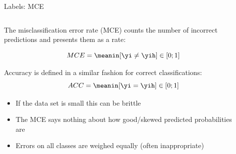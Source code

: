 \documentclass[11pt,compress,t,notes=noshow, xcolor=table]{beamer}
\begin{document}
\begin{vbframe}{Labels: MCE}

\begin{columns}
\begin{column}{0.7\textwidth} 
\begin{footnotesize}
The misclassification error rate (MCE) counts the number of incorrect predictions and presents them as a rate:

\[
MCE = \meanin [\yi \neq \yih] \in [0;1]
\]

Accuracy is defined in a similar fashion for correct classifications:
\[
ACC = \meanin [\yi = \yih] \in [0;1]
\]

\begin{itemize}
\item If the data set is small this can be brittle
\item The MCE says nothing about how good/skewed predicted probabilities are
\item Errors on all classes are weighed equally (often inappropriate)
\end{itemize}

\end{footnotesize}
\end{column}

\begin{column}{0.29\textwidth}



\end{column}
\end{columns}
\end{vbframe}
\end{document}
